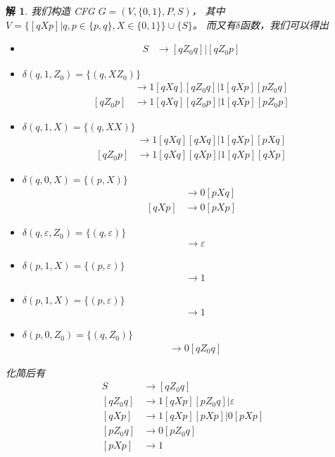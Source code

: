 \documentclass[12pt,onecolumn]{article}
\theoremstyle{plain}
\newtheorem{solution}{解}[section]
\begin{document}
\begin{solution}
 我们构造 CFG $G = (V, \{0, 1\}, P, S)$，
 其中$V = \{ [qXp] | q, p \in \{p, q\}, X \in \{0, 1\}\} \cup \{S\}$。
 而又有$\delta$函数，我们可以得出
 \begin{itemize}
 \item
 \begin{align*}
 S & \to [qZ_0q] | [qZ_0p]
 \end{align*}
 \item  $\delta(q,1,Z_0) = \{(q,XZ_0)\}$
 \begin{align*}
 [qZ_0q] & \to 1[qXq][qZ_0q] | 1[qXp][pZ_0q] \\
 [qZ_0p] & \to 1[qXq][qZ_0p] | 1[qXp][pZ_0p]
 \end{align*}
 \item $\delta(q,1,X) = \{(q,XX)\}$
 \begin{align*}
 [qZ_0q] & \to 1[qXq][qXq] | 1[qXp][pXq] \\
 [qZ_0p] & \to 1[qXq][qXp] | 1[qXp][qXp]
 \end{align*}
 \item $\delta(q,0,X) = \{(p,X)\}$
 \begin{align*}
 [qXq] & \to 0[pXq] \\
 [qXp] & \to 0[pXp]
 \end{align*}
 \item $\delta(q,ε, Z_0) = \{(q, \varepsilon)\}$
 \begin{align*}
 [qZq] & \to \varepsilon
 \end{align*}
 \item $\delta(p,1,X) = \{(p, \varepsilon)\}$
 \begin{align*}
 [pXp] & \to 1
 \end{align*}
 \item $\delta(p,1,X) = \{(p, \varepsilon)\}$
 \begin{align*}
 [pXp] & \to 1
 \end{align*}
 \item $\delta(p,0,Z_0) = \{(q, Z_0)\}$
 \begin{align*}
 [pZ_0q] & \to 0[qZ_0q]
 \end{align*}
 \end{itemize}

 化简后有
 \begin{align*}
 S       & \to [qZ_0q]                     \\
 [qZ_0q] & \to 1[qXp][pZ_0q] | \varepsilon \\
 [qXp]   & \to 1[qXp][pXp] | 0[pXp]        \\
 [pZ_0q] & \to 0[pZ_0q]                    \\
 [pXp]   & \to 1
 \end{align*}
\end{solution}
\end{document}
